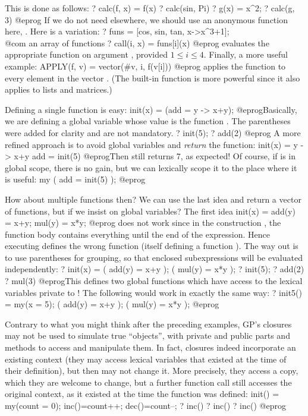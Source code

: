  This is done as follows:
\bprog
? calc(f, x) = f(x)
? calc(sin, Pi)
? g(x) = x^2;
? calc(g, 3)
@eprog
\noindent If we do not need  elsewhere, we should use an anonymous
function here, . Here is a variation:
\bprog
? funs = [cos, sin, tan, x->x^3+1]; \\@com an array of functions
? call(i, x) = funs[i](x)
@eprog\noindent
evaluates the appropriate function on argument ,
provided $1\leq i\leq 4$. Finally, a more useful example:
\bprog
APPLY(f, v) = vector(#v, i, f(v[i]))
@eprog\noindent
applies the function  to every element in the vector .
(The built-in function  is more powerful since it also applies to
lists and matrices.)

Defining a single function is easy:
\bprog
init(x) = (add = y -> x+y);
@eprog\noindent Basically, we are defining a global variable 
whose value is the function . The parentheses were added for
clarity and are not mandatory.
\bprog
? init(5);
? add(2)
@eprog\noindent
A more refined approach is to
avoid global variables and \emph{return} the function:
\bprog
init(x) = y -> x+y
add = init(5)
@eprog\noindent Then  still returns 7, as expected! Of course,
if  is in global scope, there is no gain, but we can
lexically scope it to the place where it is useful:
\bprog
  my ( add = init(5) );
@eprog

How about multiple functions then? We can use the last idea and return a
vector of functions, but if we insist on global variables?
The first idea
\bprog
init(x) = add(y) = x+y; mul(y) = x*y;
@eprog
\noindent does not work since in the construction , the
function body contains everything until the end of the expression. Hence
executing  defines the wrong function  (itself defining
a function ). The way out is to
use parentheses for grouping, so that enclosed subexpressions will be
evaluated independently:
\bprog
? init(x) = ( add(y) = x+y ); ( mul(y) = x*y );
? init(5);
? add(2)
? mul(3)
@eprog\noindent This defines two global functions which have access to the
lexical variables private to ! The following would work in exactly
the same way:
\bprog
? init5() = my(x = 5); ( add(y) = x+y ); ( mul(y) = x*y );
@eprog

 Contrary to what you might think after the
preceding examples, GP's closures may not be used to simulate true
``objects'', with private and public parts and methods to access and
manipulate them. In fact, closures indeed incorporate an existing context
(they may access lexical variables that existed at the time of their
definition), but then may not change it. More precisely, they access a copy,
which they are welcome to change, but a further function call still accesses
the original context, as it existed at the time the function was defined:
\bprog
init() =
{ my(count = 0);
  inc()=count++;
  dec()=count--;
}
? inc()
? inc()
? inc()
@eprog

